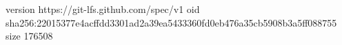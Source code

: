 version https://git-lfs.github.com/spec/v1
oid sha256:22015377e4acffdd3301ad2a39ea5433360fd0eb476a35cb5908b3a5ff088755
size 176508
